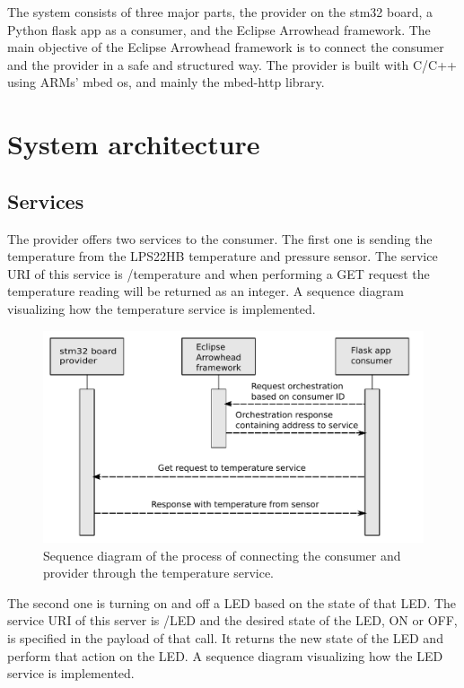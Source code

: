 The system consists of three major parts, the provider on the stm32 board, a Python flask app as a consumer, and the Eclipse Arrowhead framework.
The main objective of the Eclipse Arrowhead framework is to connect the consumer and the provider in a safe and structured way.
The provider is built with C/C++ using ARMs' mbed os, and mainly the mbed-http library. 
\section{System architecture}
\subsection{Services}
The provider offers two services to the consumer. 
The first one is sending the temperature from the LPS22HB temperature and pressure sensor. 
The service URI of this service is /temperature and when performing a GET request the temperature reading will be returned as an integer.
A sequence diagram visualizing how the temperature service is implemented.
\begin{figure}[H]
    \centering
    \includegraphics[width=\textwidth]{Pictures/sequence_diagram_consumer.pdf} 
    \caption{Sequence diagram of the process of connecting the consumer and provider through the temperature service.}
    \label{sequence diagram consumer}
\end{figure}
The second one is turning on and off a LED based on the state of that LED.
The service URI of this server is /LED and the desired state of the LED, ON or OFF, is specified in the payload of that call.
It returns the new state of the LED and perform that action on the LED.
A sequence diagram visualizing how the LED service is implemented.
